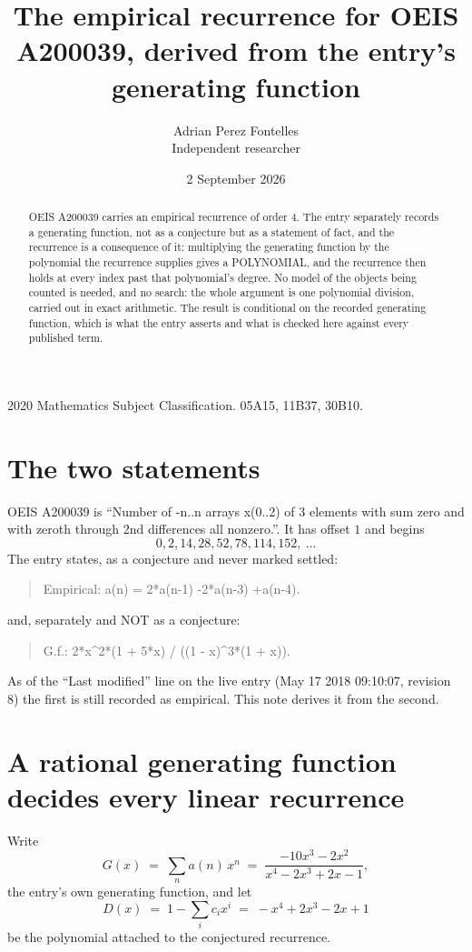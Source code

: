 \documentclass[11pt,a4paper]{article}
\title{The empirical recurrence for OEIS A200039, derived from the entry's generating function}
\author{Adrian Perez Fontelles\\ \small Independent researcher}
\date{2 September 2026}
\theoremstyle{plain}
\theoremstyle{definition}
\begin{document}
\maketitle

\begin{abstract}
OEIS A200039 carries an empirical recurrence of order $4$. The entry separately records a
generating function, not as a conjecture but as a statement of fact, and the recurrence is a
consequence of it: multiplying the generating function by the polynomial the recurrence
supplies gives a POLYNOMIAL, and the recurrence then holds at every index past that
polynomial's degree. No model of the objects being counted is needed, and no search: the
whole argument is one polynomial division, carried out in exact arithmetic. The result is
conditional on the recorded generating function, which is what the entry asserts and what is
checked here against every published term.
\end{abstract}

\noindent\small 2020 Mathematics Subject Classification. 05A15, 11B37, 30B10.\normalsize

\section{The two statements}

OEIS A200039 is ``Number of -n..n arrays x(0..2) of 3 elements with sum zero and with zeroth through 2nd differences all nonzero.''. It has offset $1$ and begins
\[
0, 2, 14, 28, 52, 78, 114, 152,\ \dots
\]
The entry states, as a conjecture and never marked settled:
\begin{quote}
Empirical: a(n) = 2*a(n-1) -2*a(n-3) +a(n-4).
\end{quote}
and, separately and NOT as a conjecture:
\begin{quote}
G.f.: 2*x\^{}2*(1 + 5*x) / ((1 - x)\^{}3*(1 + x)).
\end{quote}
As of the ``Last modified'' line on the live entry (May 17 2018 09:10:07, revision 8) the first is still
recorded as empirical. This note derives it from the second.

\section{A rational generating function decides every linear recurrence}

Write
\[
G(x)\;=\;\sum_{n}a(n)\,x^{n}\;=\;\frac{- 10 x^{3} - 2 x^{2}}{x^{4} - 2 x^{3} + 2 x - 1},
\]
the entry's own generating function, and let
\[
D(x)\;=\;1-\sum_i c_i x^{i}\;=\;- x^{4} + 2 x^{3} - 2 x + 1
\]
be the polynomial attached to the conjectured recurrence.
\end{document}
